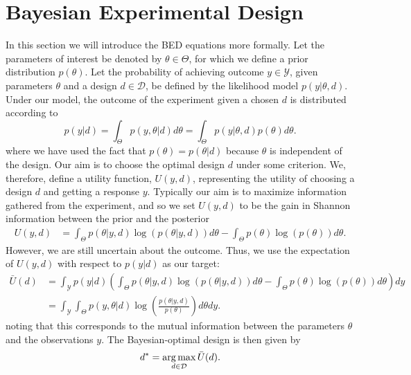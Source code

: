 
\section{Bayesian Experimental Design}
\label{sec:design:bed}

In this section we will introduce the BED equations more formally.
Let the parameters of interest be denoted by $\theta \in \Theta$, for which we define a prior distribution $p(\theta)$.
Let the probability of achieving outcome $y\in\mathcal{Y}$, given parameters $\theta$ 
and a design $d \in \mathcal{D}$, be defined by the likelihood model $p(y | \theta, d)$.
Under our model, the outcome of the experiment given a chosen $d$ is distributed according to
\begin{equation}
\label{eq:marginal_def}
p(y | d) = \int_{\Theta} p(y,\theta | d) d\theta = \int_{\Theta} p(y | \theta, d) p(\theta) d\theta.
\end{equation}
where we have used the fact that $p(\theta)=p(\theta|d)$ because $\theta$ is independent of the design.
Our aim is to choose the optimal design $d$ under some criterion. 
We, therefore, define a utility function, $U(y,d)$, representing the utility of choosing a design $d$ 
and getting a response $y$.
Typically our aim is to maximize information gathered from the experiment, and so we set 
$U(y,d)$ to be the gain in Shannon information between the prior and the posterior
\begin{align}
\label{eq:shannon_inf}
U(y,d) &= \int_{\Theta} p(\theta |y, d) \log(p(\theta |y, d)) d\theta -\int_{\Theta} p(\theta) \log(p(\theta))d\theta.
\end{align}
However, we are still uncertain about the outcome. Thus, we use the expectation of $U(y,d)$ with respect to $p(y | d)$
as our target:
\begin{align}
\bar{U}(d) 
&=\int_{\mathcal{Y}} p(y|d) \left(
\int_{\Theta} p(\theta | y, d)\log(p(\theta |y, d)) d\theta - 
\int_{\Theta} p(\theta) \log(p(\theta)) d\theta \right) dy \nonumber\\
&=\int_{\mathcal{Y}}\int_{\Theta} p(y,\theta | d)\log\left(\frac{p(\theta |y, d)}{p(\theta)}\right)d\theta dy. 
\label{eq:u_bar_1}
\end{align}
noting that this corresponds to the mutual information between the parameters $\theta$ and
the observations $y$.  The Bayesian-optimal design is then given by
\begin{equation}
\label{eq:d_star}
d^* = \operatorname*{arg\,max}_{d \in \mathcal{D}} \bar{U}(d).
\end{equation}

